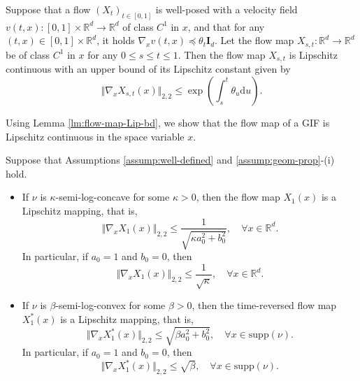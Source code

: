 \documentclass[twoside,11pt]{article}
\def\rmI{{\mathbf{I}}}
\def\sR{{\mathbb{R}}}
\newcommand{\diff}{\mathrm{d}}
\numberwithin{equation}{section}
\begin{document}
\begin{lemma} \label{lm:flow-map-Lip-bd}
Suppose that a flow $(X_t)_{t \in [0, 1]}$ is well-posed with a velocity field $v(t, x): [0, 1] \times \sR^d \to \sR^d$ of class $C^1$ in $x$, and that for any $(t, x) \in [0, 1] \times \sR^d$, it holds $\nabla_x v(t, x) \preceq \theta_t \rmI_d$.
Let the flow map $X_{s,t}: \sR^d \to \sR^d$ be of class $C^1$ in $x$ for any $0 \le s \le t \le 1$.
Then the flow map $X_{s,t}$ is Lipschitz continuous with an upper bound of its Lipschitz constant given by
\begin{equation}
    \Vert \nabla_x X_{s,t}(x) \Vert_{2,2} \le \exp \left( \int_s^t \theta_u \diff u \right).
\end{equation}
\end{lemma}

Using Lemma \ref{lm:flow-map-Lip-bd}, we show that the flow map of a GIF is Lipschitz continuous in the space variable $x$.

\begin{proposition} \label{prop:lip-map}
 Suppose that Assumptions \ref{assump:well-defined} and \ref{assump:geom-prop}-(i) hold.
\begin{itemize}
    \item[(i)] If $\nu$ is $\kappa$-semi-log-concave for some $\kappa > 0$, then the flow map $X_1(x)$ is a Lipschitz mapping, that is,
    \begin{equation*}
\Vert \nabla_x X_1(x) \Vert_{2,2} \le \frac{1}{\sqrt{\kappa a_0^2 + b_0^2}}, \quad \forall x \in \sR^d.
    \end{equation*}
    In particular, if $a_0 = 1$ and $b_0 = 0$, then
    \begin{equation*}
        \Vert \nabla_x X_1(x) \Vert_{2,2} \le \frac{1} {\sqrt{\kappa}}, \quad \forall x \in \sR^d.
    \end{equation*}

    \item[(ii)] If $\nu$ is $\beta$-semi-log-convex for some $\beta >0$, then the time-reversed flow map $X^{*}_1(x)$ is a Lipschitz mapping, that is,
    \begin{equation*}
        \Vert \nabla_x X^{*}_1(x) \Vert_{2,2} \le \sqrt{\beta a_0^2 + b_0^2}, \quad \forall x \in \mathrm{supp}(\nu).
    \end{equation*}
    In particular, if $a_0 = 1$ and $b_0 = 0$, then
    \begin{equation*}
        \Vert \nabla_x X^{*}_1(x) \Vert_{2,2} \le \sqrt{\beta}, \quad \forall x \in \mathrm{supp}(\nu).
    \end{equation*}
\end{itemize}
\end{proposition}
\end{document}
